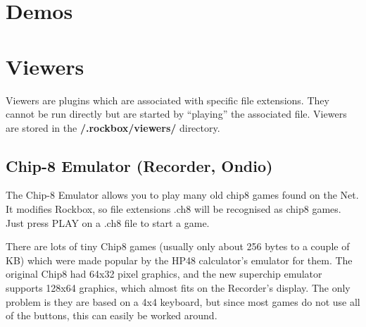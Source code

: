 


\section{Demos}




{}






\section{\label{ref:Viewersplugins}Viewers}

Viewers are plugins which are associated with specific file extensions.
They cannot be run directly but are started by ``playing''
the associated file.  Viewers are stored in the
\textbf{/.rockbox/viewers/ }directory.

\subsection{\label{ref:Chip8emulator}Chip{}-8 Emulator (Recorder, Ondio)}
The Chip{}-8 Emulator allows you to play many old chip8 games found on
the Net. It modifies Rockbox, so file extensions .ch8 will be
recognised as chip8 games. Just press PLAY on a .ch8 file to start a
game.

There are lots of tiny Chip8 games (usually only about 256 bytes to a
couple of KB) which were made popular by the HP48
calculator's emulator for them. The original Chip8 had
64x32 pixel graphics, and the new superchip emulator supports 128x64
graphics, which almost fits on the Recorder's display.
The only problem is they are based on a 4x4 keyboard, but since most
games do not use all of the buttons, this can easily be worked around.

